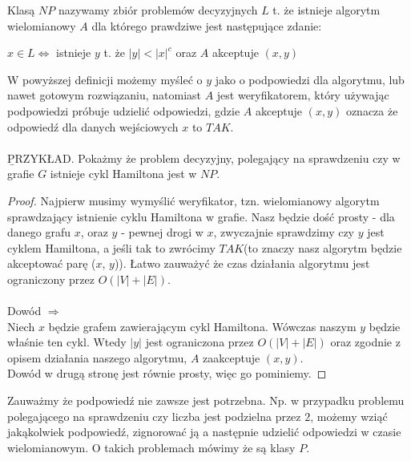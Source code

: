 \begin{definition}[Klasa $NP$]
Klasą $NP$ nazywamy zbiór problemów decyzyjnych $L$ t. że istnieje algorytm wielomianowy $A$ dla którego prawdziwe jest następujące zdanie:
\begin{center}
$x \in L \iff $ istnieje $y$ t. że $|y| < |x|^c$ oraz $A$ akceptuje $(x,y)$
\end{center}
\end{definition}
\noindent
W powyższej definicji możemy myśleć o $y$ jako o podpowiedzi dla algorytmu, lub nawet gotowym rozwiązaniu, natomiast $A$ jest weryfikatorem, który używając podpowiedzi próbuje udzielić odpowiedzi, gdzie $A$ akceptuje $(x,y)$ oznacza że odpowiedź dla danych wejściowych $x$ to $TAK$.
\\
\\ \noindent
\b{PRZYKŁAD}. Pokażmy że problem decyzyjny, polegający na sprawdzeniu czy w grafie $G$ istnieje cykl Hamiltona jest w $NP$.
\begin{proof}
Najpierw musimy wymyślić weryfikator, tzn. wielomianowy algorytm sprawdzający istnienie cyklu Hamiltona w grafie. 
Nasz będzie dość prosty - dla danego grafu $x$, oraz $y$ - pewnej drogi w $x$, zwyczajnie sprawdzimy czy $y$ jest cyklem Hamiltona, a jeśli tak to zwrócimy $TAK$(to znaczy nasz algorytm będzie akceptować parę ($x$, $y$)). 
Łatwo zauważyć że czas działania algorytmu jest ograniczony przez $O(|V| + |E|)$.
\\
\\ \noindent
Dowód $\Rightarrow$ \\ \noindent
Niech $x$ będzie grafem zawierającym cykl Hamiltona. 
Wówczas naszym $y$ będzie właśnie ten cykl. 
Wtedy $|y|$ jest ograniczona przez $O(|V| + |E|)$ oraz zgodnie z opisem działania naszego algorytmu, $A$ zaakceptuje $(x, y)$. 
\\ \noindent
Dowód w drugą stronę jest równie prosty, więc go pominiemy.
\end{proof}

\noindent
Zauważmy że podpowiedź nie zawsze jest potrzebna. 
Np. w przypadku problemu polegającego na sprawdzeniu czy liczba jest podzielna przez $2$, możemy wziąć jakąkolwiek podpowiedź, zignorować ją a następnie udzielić odpowiedzi w czasie wielomianowym. O takich problemach mówimy że są klasy $P$. 
\\
\\ \noindent

